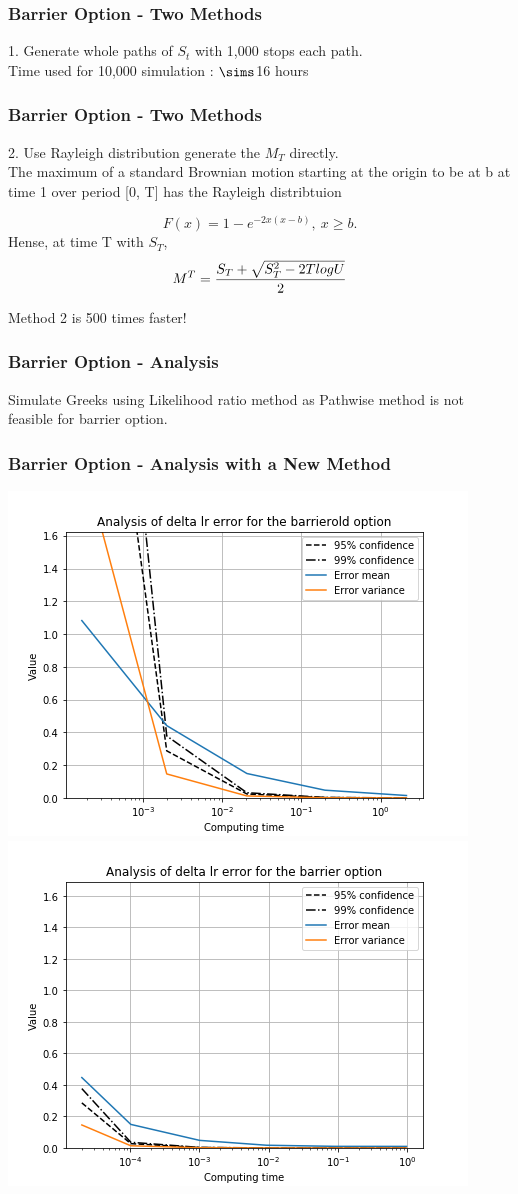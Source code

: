 \documentclass[12pt]{beamer}
\begin{document}
\begin{frame}
\frametitle{Barrier Option - Two Methods}

1. Generate whole paths of $S_t$ with 1,000 stops each path.\\

Time used for 10,000 simulation : $\sims$16 hours

\end{frame}

\begin{frame}
\frametitle{Barrier Option - Two Methods}

2. Use Rayleigh distribution generate the $M_T$ directly. \\
The maximum of a standard Brownian motion starting at the origin to be at b at time 1 over period [0, T] has the Rayleigh distribtuion

$$F(x) = 1 - e^{-2x(x-b)}, \ x \geq b.$$
Hense, at time T with $S_T$,
$$M^T={S_T+\sqrt{S_T^2-2TlogU}\over 2}$$

Method 2 is 500 times faster!

\end{frame}

\begin{frame}
\frametitle{Barrier Option - Analysis}
Simulate Greeks using Likelihood ratio method as Pathwise method is not feasible for barrier option.


\end{frame}

\begin{frame}
\frametitle{Barrier Option - Analysis with a New Method}
\includegraphics[width=.5\textwidth]{graphs/barrierolddeltalrtime.png}
\includegraphics[width=.5\textwidth]{graphs/barrierdeltalrtime.png}
\end{frame}
\end{document}
